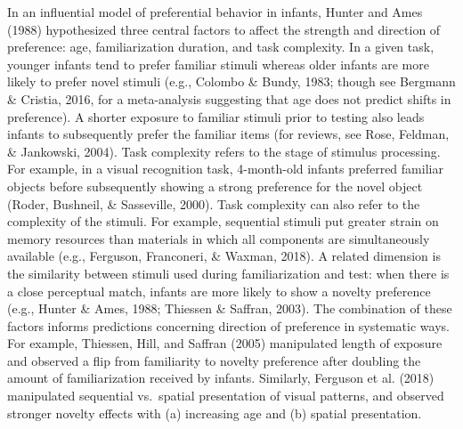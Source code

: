 \documentclass[english,man,man,floatsintext]{apa6}
\begin{document}
In an influential model of preferential behavior in infants, Hunter and Ames (1988) hypothesized three central factors to affect the strength and direction of preference: age, familiarization duration, and task complexity. In a given task, younger infants tend to prefer familiar stimuli whereas older infants are more likely to prefer novel stimuli (e.g., Colombo \& Bundy, 1983; though see Bergmann \& Cristia, 2016, for a meta-analysis suggesting that age does not predict shifts in preference). A shorter exposure to familiar stimuli prior to testing also leads infants to subsequently prefer the familiar items (for reviews, see Rose, Feldman, \& Jankowski, 2004). Task complexity refers to the stage of stimulus processing. For example, in a visual recognition task, 4-month-old infants preferred familiar objects before subsequently showing a strong preference for the novel object (Roder, Bushneil, \& Sasseville, 2000). Task complexity can also refer to the complexity of the stimuli. For example, sequential stimuli put greater strain on memory resources than materials in which all components are simultaneously available (e.g., Ferguson, Franconeri, \& Waxman, 2018). A related dimension is the similarity between stimuli used during familiarization and test: when there is a close perceptual match, infants are more likely to show a novelty preference (e.g., Hunter \& Ames, 1988; Thiessen \& Saffran, 2003). The combination of these factors informs predictions concerning direction of preference in systematic ways. For example, Thiessen, Hill, and Saffran (2005) manipulated length of exposure and observed a flip from familiarity to novelty preference after doubling the amount of familiarization received by infants. Similarly, Ferguson et al. (2018) manipulated sequential vs.~spatial presentation of visual patterns, and observed stronger novelty effects with (a) increasing age and (b) spatial presentation.
\end{document}
